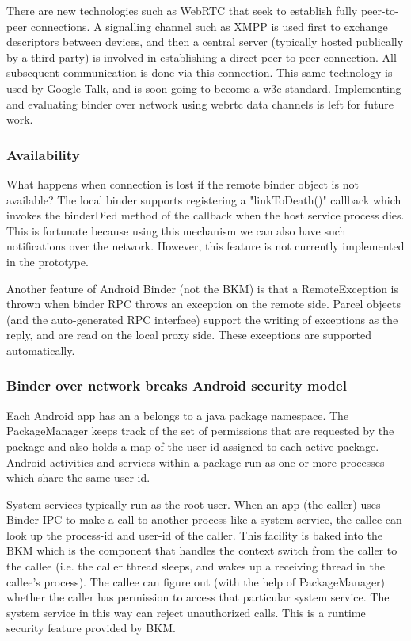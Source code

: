 \documentclass[prodmode]{acmlarge}
\begin{document}
There are new technologies such as WebRTC that seek to establish fully peer-to-peer connections. A signalling channel such as XMPP is used first to exchange descriptors between devices, and then a central server (typically hosted publically by a third-party) is involved in establishing a direct peer-to-peer connection. All subsequent communication is done via this connection. This same technology is used by Google Talk, and is soon going to become a w3c standard. Implementing and evaluating binder over network using webrtc data channels is left for future work.

\subsubsection{Availability}
What happens when connection is lost if the remote binder object is not available? The local binder supports registering a "linkToDeath()"  callback which invokes the binderDied method of the callback when the host service process dies. This is fortunate because using this mechanism we can also have such notifications over the network. However, this feature is not currently implemented in the prototype.

Another feature of Android Binder (not the BKM) is that a RemoteException is thrown when binder RPC throws an exception on the remote side. Parcel objects (and the auto-generated RPC interface) support the writing of exceptions as the reply, and are read on the local proxy side. These exceptions are supported automatically. 

\subsubsection{Binder over network breaks Android security model}
Each Android app has an a belongs to a java package namespace. The PackageManager keeps track of the set of permissions that are requested by the package and also holds a map of the user-id assigned to each active package. Android activities and services within a package run as one or more processes which share the same user-id.

System services typically run as the root user. When an app (the caller) uses Binder IPC to make a call to another process like a system service, the callee can look up the process-id and user-id of the caller. This facility is baked into the BKM which is the component that handles the context switch from the caller to the callee (i.e. the caller thread sleeps, and wakes up a receiving thread in the callee's process). The callee can figure out (with the help of PackageManager) whether the caller has permission to access that particular system service. The system service in this way can reject unauthorized calls. This is a runtime security feature provided by BKM.
\end{document}
